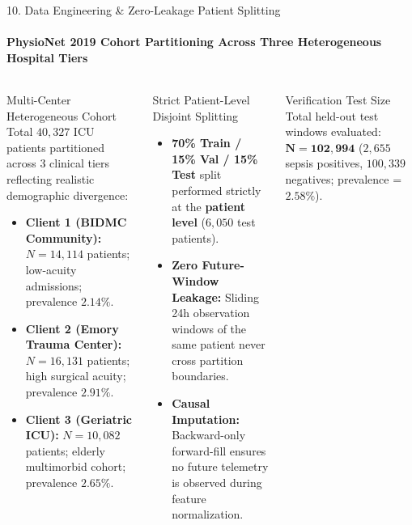 \documentclass[aspectratio=169, 10pt]{beamer}
\begin{document}
\begin{frame}{10. Data Engineering \& Zero-Leakage Patient Splitting}
    \framesubtitle{PhysioNet 2019 Cohort Partitioning Across Three Heterogeneous Hospital Tiers}
    \begin{columns}[T]
        \begin{block}{Multi-Center Heterogeneous Cohort}
            \scriptsize
            Total $40,327$ ICU patients partitioned across 3 clinical tiers reflecting realistic demographic divergence:
            \begin{itemize}
                \item \textbf{Client 1 (BIDMC Community):} $N = 14,114$ patients; low-acuity admissions; prevalence $2.14\%$.
                \item \textbf{Client 2 (Emory Trauma Center):} $N = 16,131$ patients; high surgical acuity; prevalence $2.91\%$.
                \item \textbf{Client 3 (Geriatric ICU):} $N = 10,082$ patients; elderly multimorbid cohort; prevalence $2.65\%$.
            \end{itemize}
        \end{block}

        \begin{block}{Strict Patient-Level Disjoint Splitting}
            \scriptsize
            \begin{itemize}
                \item \textbf{70\% Train / 15\% Val / 15\% Test} split performed strictly at the \textbf{patient level} ($6,050$ test patients).
                \item \textbf{Zero Future-Window Leakage:} Sliding 24h observation windows of the same patient never cross partition boundaries.
                \item \textbf{Causal Imputation:} Backward-only forward-fill ensures no future telemetry is observed during feature normalization.
            \end{itemize}
        \end{block}

        \begin{exampleblock}{\scriptsize Verification Test Size}
            \scriptsize
            Total held-out test windows evaluated: $\mathbf{N = 102,994}$ ($2,655$ sepsis positives, $100,339$ negatives; prevalence = $2.58\%$).
        \end{exampleblock}
    \end{columns}
\end{frame}
\end{document}
